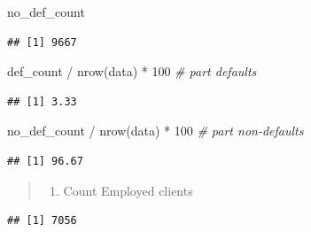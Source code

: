 \documentclass[
]{book}
\newenvironment{Shaded}{\begin{snugshade}}{\end{snugshade}}
\newcommand{\CommentTok}[1]{\textcolor[rgb]{0.56,0.35,0.01}{\textit{#1}}}
\newcommand{\DecValTok}[1]{\textcolor[rgb]{0.00,0.00,0.81}{#1}}
\newcommand{\FunctionTok}[1]{\textcolor[rgb]{0.00,0.00,0.00}{#1}}
\newcommand{\NormalTok}[1]{#1}
\newcommand{\OtherTok}[1]{\textcolor[rgb]{0.56,0.35,0.01}{#1}}
\newcommand{\SpecialCharTok}[1]{\textcolor[rgb]{0.00,0.00,0.00}{#1}}
\providecommand{\tightlist}{%
  \setlength{\itemsep}{0pt}\setlength{\parskip}{0pt}}
\begin{document}
\begin{Shaded}
\begin{Highlighting}[]
\NormalTok{no\_def\_count }
\end{Highlighting}
\end{Shaded}

\begin{verbatim}
## [1] 9667
\end{verbatim}

\begin{Shaded}
\begin{Highlighting}[]
\NormalTok{def\_count }\SpecialCharTok{/} \FunctionTok{nrow}\NormalTok{(data) }\SpecialCharTok{*} \DecValTok{100} \CommentTok{\# part defaults}
\end{Highlighting}
\end{Shaded}

\begin{verbatim}
## [1] 3.33
\end{verbatim}

\begin{Shaded}
\begin{Highlighting}[]
\NormalTok{no\_def\_count }\SpecialCharTok{/} \FunctionTok{nrow}\NormalTok{(data) }\SpecialCharTok{*} \DecValTok{100} \CommentTok{\# part non{-}defaults}
\end{Highlighting}
\end{Shaded}

\begin{verbatim}
## [1] 96.67
\end{verbatim}

\begin{quote}
\begin{enumerate}
\def\labelenumi{\arabic{enumi}.}
\setcounter{enumi}{2}
\tightlist
\item
  Count Employed clients
\end{enumerate}
\end{quote}

\begin{Shaded}
\end{Shaded}

\begin{verbatim}
## [1] 7056
\end{verbatim}
\end{document}

